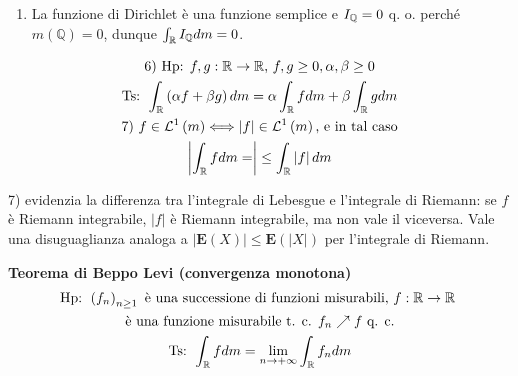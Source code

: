 \documentclass{article}
\begin{document}
\begin{enumerate}
\item La funzione di Dirichlet \`{e} una funzione semplice e $I_{%
\mathbb{Q}
}=0$ q. o. perch\'{e} $m\left( 
\mathbb{Q}
\right) =0$, dunque $\int_{%
\mathbb{R}
}I_{%
\mathbb{Q}
}dm=0$.
\end{enumerate}

\begin{gather*}
\text{6) Hp: }f,g:%
\mathbb{R}
\rightarrow 
\mathbb{R}
\text{, }f,g\geq 0,\alpha ,\beta \geq 0 \\
\text{Ts: }\int_{%
\mathbb{R}
}\left( \alpha f+\beta g\right) dm=\alpha \int_{%
\mathbb{R}
}fdm+\beta \int_{%
\mathbb{R}
}gdm \\
\text{7) }f\in \mathcal{L}^{1}\left( m\right) \Longleftrightarrow \left\vert
f\right\vert \in \mathcal{L}^{1}\left( m\right) \text{, e in tal caso} \\
\left\vert \int_{%
\mathbb{R}
}fdm=\right\vert \leq \int_{%
\mathbb{R}
}\left\vert f\right\vert dm
\end{gather*}

7) evidenzia la differenza tra l'integrale di Lebesgue e l'integrale di
Riemann: se $f$ \`{e} Riemann integrabile, $\left\vert f\right\vert $ \`{e}
Riemann integrabile, ma non vale il viceversa. Vale una disuguaglianza
analoga a $\left\vert \mathbf{E}\left( X\right) \right\vert \leq \mathbf{E}%
\left( \left\vert X\right\vert \right) $ per l'integrale di Riemann.

\textbf{Teorema di Beppo Levi (convergenza monotona)}%
\begin{gather*}
\text{Hp: }\left( f_{n}\right) _{n\geq 1}\text{ \`{e} una successione di
funzioni misurabili, }f:%
\mathbb{R}
\rightarrow 
\mathbb{R}
\text{ } \\
\text{\`{e} una funzione misurabile t. c. }f_{n}\nearrow f\text{ q. c.} \\
\text{Ts: }\int_{%
\mathbb{R}
}fdm=\lim_{n\rightarrow +\infty }\int_{%
\mathbb{R}
}f_{n}dm
\end{gather*}
\end{document}
